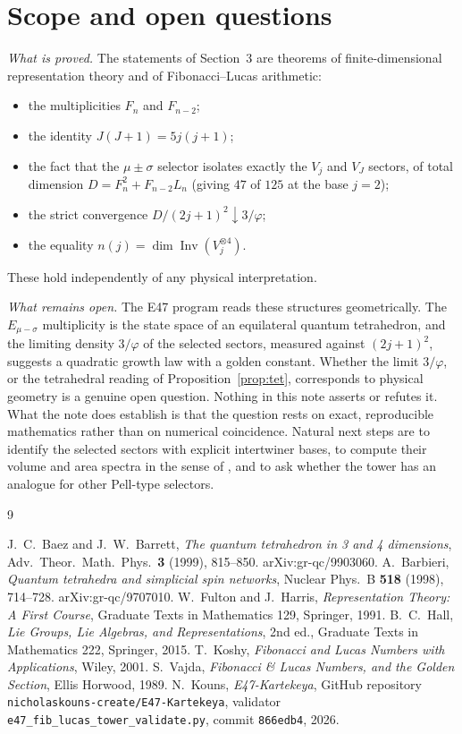 \documentclass[11pt]{amsart}
\theoremstyle{definition}
\theoremstyle{remark}
\newcommand{\Inv}{\operatorname{Inv}}
\begin{document}
\section{Scope and open questions}\label{sec:scope}

\emph{What is proved.} The statements of Section~3 are theorems of finite-dimensional representation theory and of Fibonacci--Lucas arithmetic:
\begin{itemize}
\item the multiplicities $F_n$ and $F_{n-2}$;
\item the identity $J(J+1)=5j(j+1)$;
\item the fact that the $\mu\pm\sigma$ selector isolates exactly the $V_j$ and $V_J$ sectors, of total dimension $D=F_n^2+F_{n-2}L_n$ (giving $47$ of $125$ at the base $j=2$);
\item the strict convergence $D/(2j+1)^2\downarrow 3/\varphi$;
\item the equality $n(j)=\dim\Inv(V_j^{\otimes4})$.
\end{itemize}
These hold independently of any physical interpretation.

\emph{What remains open.} The E47 program reads these structures geometrically. The $E_{\mu-\sigma}$ multiplicity is the state space of an equilateral quantum tetrahedron, and the limiting density $3/\varphi$ of the selected sectors, measured against $(2j+1)^2$, suggests a quadratic growth law with a golden constant. Whether the limit $3/\varphi$, or the tetrahedral reading of Proposition~\ref{prop:tet}, corresponds to physical geometry is a genuine open question. Nothing in this note asserts or refutes it. What the note does establish is that the question rests on exact, reproducible mathematics rather than on numerical coincidence. Natural next steps are to identify the selected sectors with explicit intertwiner bases, to compute their volume and area spectra in the sense of \cite{BaezBarrett}, and to ask whether the tower has an analogue for other Pell-type selectors.

\begin{thebibliography}{9}\raggedright
{} J.~C.~Baez and J.~W.~Barrett, \emph{The quantum tetrahedron in 3 and 4 dimensions}, Adv.\ Theor.\ Math.\ Phys.\ \textbf{3} (1999), 815--850. arXiv:gr-qc/9903060.
 A.~Barbieri, \emph{Quantum tetrahedra and simplicial spin networks}, Nuclear Phys.\ B \textbf{518} (1998), 714--728. arXiv:gr-qc/9707010.
 W.~Fulton and J.~Harris, \emph{Representation Theory: A First Course}, Graduate Texts in Mathematics 129, Springer, 1991.
 B.~C.~Hall, \emph{Lie Groups, Lie Algebras, and Representations}, 2nd ed., Graduate Texts in Mathematics 222, Springer, 2015.
 T.~Koshy, \emph{Fibonacci and Lucas Numbers with Applications}, Wiley, 2001.
 S.~Vajda, \emph{Fibonacci \& Lucas Numbers, and the Golden Section}, Ellis Horwood, 1989.
 N.~Kouns, \emph{E47-Kartekeya}, GitHub repository \texttt{nicholaskouns-create/E47-Kartekeya}, validator \texttt{e47\_fib\_lucas\_tower\_validate.py}, commit \texttt{866edb4}, 2026.
\end{thebibliography}
\end{document}

